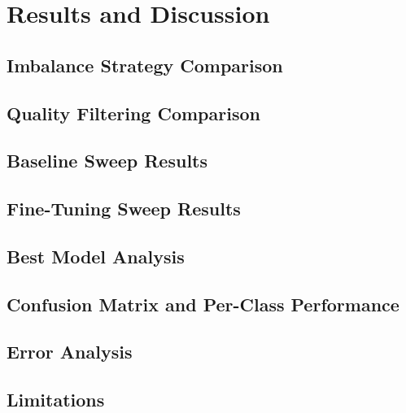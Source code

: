 \chapter{Results and Discussion}

\section{Imbalance Strategy Comparison}

\section{Quality Filtering Comparison}

\section{Baseline Sweep Results}

\section{Fine-Tuning Sweep Results}

\section{Best Model Analysis}

\section{Confusion Matrix and Per-Class Performance}

\section{Error Analysis}

\section{Limitations}
